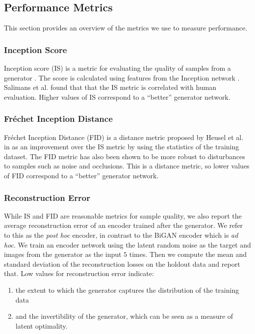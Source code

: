 \documentclass[10pt,twocolumn,letterpaper]{article}
\begin{document}
\subsection{Performance Metrics}

This section provides an overview of the metrics we use to measure performance.

\subsubsection{Inception Score}

Inception score (IS) is a metric for evaluating the quality of samples from a generator \cite{salimans2016improved}. The score is calculated using features from the Inception network \cite{szegedy2016rethinking}. Salimans et al. found that that the IS metric is correlated with human evaluation. Higher values of IS correspond to a ``better'' generator network.

\subsubsection{Fréchet Inception Distance}

Fréchet Inception Distance (FID) is a distance metric proposed by Heusel et al. in \cite{heusel2017gans} as an improvement over the IS metric by using the statistics of the training dataset. The FID metric has also been shown to be more robust to disturbances to samples such as noise and occlusions. This is a distance metric, so lower values of FID correspond to a ``better'' generator network.

\subsubsection{Reconstruction Error} \label{recerror}

While IS and FID  are reasonable \cite{ravuri2019seeing} metrics for sample quality, we also report the average reconstruction error of an encoder trained after the generator. We refer to this as the \textit{post hoc} \cite{dumoulin2016adversarially} encoder, in contrast to the BiGAN encoder which is \textit{ad hoc}. We train an encoder network using the  latent random noise as the target and images from the generator as the input $5$ times. Then we compute the mean and standard deviation of the reconstruction losses on the holdout data and report that. Low values for reconstruction error indicate:
\begin{enumerate}
    \item the extent to which the generator captures the distribution of the training data
    \item and the invertibility of the generator, which can be seen as a measure of latent optimality.
\end{enumerate}
\end{document}
